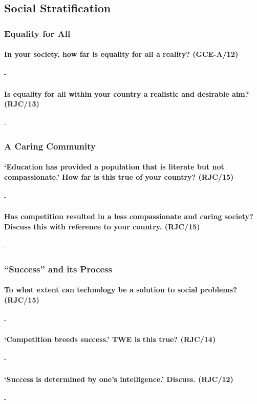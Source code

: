 \documentclass[../../main]{subfiles}
\begin{document}
\subsection{Social Stratification}

\subsubsection{Equality for All}

\paragraph{In your society, how far is equality for all a reality? (GCE-A/12)}-

\paragraph{Is equality for all within your country a realistic and desirable aim? (RJC/13)}-

\subsubsection{A Caring Community}

\paragraph{`Education has provided a population that is literate but not compassionate.' How far is this true of your country? (RJC/15)}-

\paragraph{Has competition resulted in a less compassionate and caring society? Discuss this with reference to your country. (RJC/15)}-

\subsubsection{``Success'' and its Process}

\paragraph{To what extent can technology be a solution to social problems? (RJC/15)}-

\paragraph{`Competition breeds success.' TWE is this true? (RJC/14)}-

\paragraph{`Success is determined by one's intelligence.' Discuss. (RJC/12)}-
\end{document}
